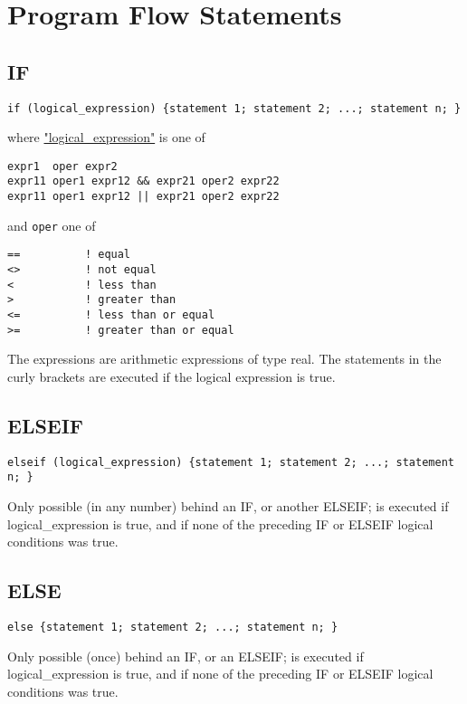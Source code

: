 
\section{Program Flow Statements}

\subsection{IF}
\begin{verbatim}
if (logical_expression) {statement 1; statement 2; ...; statement n; }
\end{verbatim}
where \href{logical}{"logical\_expression"} is one of 
\begin{verbatim}
expr1  oper expr2
expr11 oper1 expr12 && expr21 oper2 expr22
expr11 oper1 expr12 || expr21 oper2 expr22
\end{verbatim} 
and \verb+oper+ one of 
\begin{verbatim}
==          ! equal
<>          ! not equal
<           ! less than
>           ! greater than
<=          ! less than or equal
>=          ! greater than or equal
\end{verbatim} 
The expressions are arithmetic expressions of type real. The statements
in the curly brackets are executed if the logical expression is true.  


\subsection{ELSEIF}
\begin{verbatim}
elseif (logical_expression) {statement 1; statement 2; ...; statement n; }
\end{verbatim} 
Only possible (in any number) behind an IF, or another ELSEIF; is
executed if  logical\_expression is true, and if none of the preceding
IF or ELSEIF logical conditions was true.  


\subsection{ELSE}
\begin{verbatim}
else {statement 1; statement 2; ...; statement n; }
\end{verbatim} 
Only possible (once) behind an IF, or an ELSEIF; is executed if
logical\_expression is true, and if none of the preceding IF or ELSEIF
logical conditions was true.  

